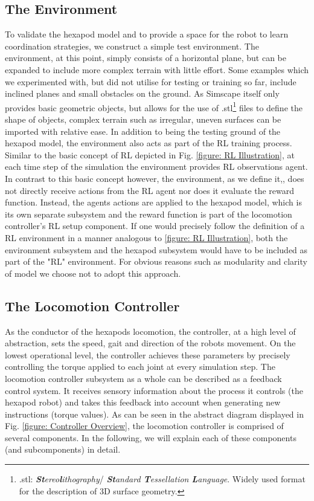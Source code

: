 \subsection{The Environment}
To validate the hexapod model and to provide a space for the robot to learn coordination strategies, we construct a simple test environment.
The environment, at this point, simply consists of a horizontal plane, but can be expanded to include more complex terrain with little effort.
Some examples which we experimented with, but did not utilise for testing or training so far, include inclined planes and small obstacles on the ground.
As Simscape itself only provides basic geometric objects, but allows for the use of .stl\footnote{.stl: \emph{\textbf{St}ereo\textbf{l}ithography}/ \emph{\textbf{St}andard \textbf{T}essellation \textbf{L}anguage}.  Widely used format for the description of 3D surface geometry.} files to define the shape of objects, complex terrain such as irregular, uneven surfaces can be imported with relative ease.
In addition to being the testing ground of the hexapod model, the environment also acts as part of the RL training process.
Similar to the basic concept of RL depicted in Fig. \ref{figure: RL Illustration}, at each time step of the simulation the environment provides RL observations agent. 
In contrast to this basic concept however, the environment, as we define it,, does not directly receive actions from the RL agent nor does it evaluate the reward function.
Instead, the agents actions are applied to the hexapod model, which is its own separate subsystem and the reward function is part of the locomotion controller's RL setup component.
If one would precisely follow the definition of a RL environment in a manner analogous to \ref{figure: RL Illustration}, both the environment subsystem and the hexapod subsystem would have to be included as part of the "RL" environment.
For obvious reasons such as modularity and clarity of model we choose not to adopt this approach.

\subsection{The Locomotion Controller} \label{subsec: Locomotion controller}
As the conductor of the hexapods locomotion, the controller, at a high level of abstraction, sets the speed, gait and direction of the robots movement.
On the lowest operational level, the controller achieves these parameters by precisely controlling the torque applied to each joint at every simulation step.
The locomotion controller subsystem as a whole can be described as a feedback control system.
It receives sensory information about the process it controls (the hexapod robot) and takes this feedback into account when generating new instructions (torque values).
As can be seen in the abstract diagram displayed in Fig. \ref{figure: Controller Overview}, the locomotion controller is comprised of several components. 
In the following, we will explain each of these components (and subcomponents) in detail.

